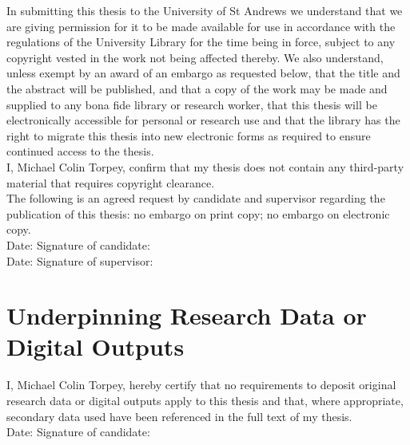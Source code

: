 \noindent
In submitting this thesis to the University of St Andrews we understand that we
are giving permission for it to be made available for use in accordance with the
regulations of the University Library for the time being in force, subject to
any copyright vested in the work not being affected thereby. We also understand,
unless exempt by an award of an embargo as requested below, that the title and
the abstract will be published, and that a copy of the work may be made and
supplied to any bona fide library or research worker, that this thesis will be
electronically accessible for personal or research use and that the library has
the right to migrate this thesis into new electronic forms as required to ensure
continued access to the thesis.
\\

\noindent
I, Michael Colin Torpey, confirm that my thesis does not contain any third-party
material that requires copyright clearance.
\\

\noindent
The following is an agreed request by candidate and supervisor regarding the
publication of this thesis: no embargo on print copy; no embargo on electronic
copy.
\\

\vspace{0.85em}
\noindent
Date:\makebox[7em]{\dotfill}
Signature of candidate:\dotfill
\\

\vspace{0.85em}
\noindent
Date:\makebox[7em]{\dotfill}
Signature of supervisor:\dotfill
\\

\vspace{-1.5em}
\section*{Underpinning Research Data or Digital Outputs}


I, Michael Colin Torpey, hereby certify that no requirements to deposit original
research data or digital outputs apply to this thesis and that, where
appropriate, secondary data used have been referenced in the full text of my
thesis.
\\

\vspace{0.85em}
\noindent
Date:\makebox[7em]{\dotfill}
Signature of candidate:\dotfill
\\

\restoregeometry
